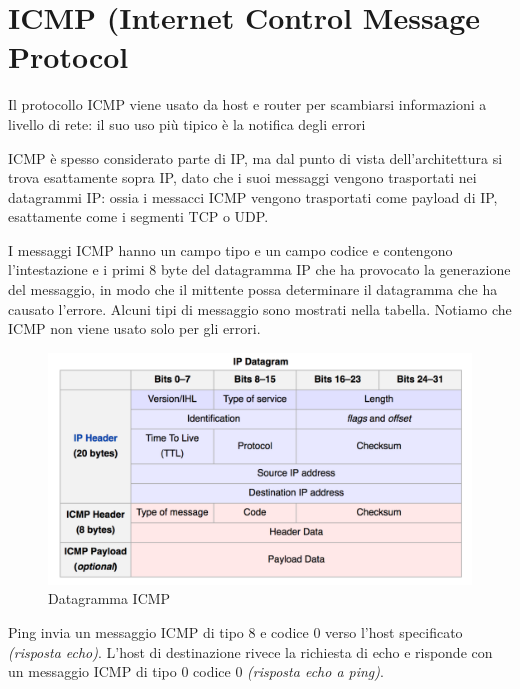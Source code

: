 \documentclass[11pt,a4paper]{book}
\begin{document}
\section{ICMP (Internet Control Message Protocol} \label{par: ICMP}
Il protocollo ICMP viene usato da host e router per scambiarsi informazioni a livello di rete: il suo uso più tipico è la notifica degli errori

ICMP è spesso considerato parte di IP, ma dal punto di vista dell'architettura si trova esattamente sopra IP, dato che i suoi messaggi vengono trasportati nei datagrammi IP: ossia i messacci ICMP vengono trasportati come payload di IP, esattamente come i segmenti TCP o UDP.

I messaggi ICMP hanno un campo tipo e un campo codice e contengono l'intestazione e i primi 8 byte del datagramma IP che ha provocato la generazione del messaggio, in modo che il mittente possa determinare il datagramma che ha causato l'errore. Alcuni tipi di messaggio sono mostrati nella tabella. Notiamo che ICMP non viene usato solo per gli errori.
\begin{figure}
	\begin{center}
		\includegraphics[scale=0.23]{img/068.png}
		\caption{Datagramma ICMP}
		\label{fig: 068}
	\end{center}
\end{figure}

Ping invia un messaggio ICMP di tipo 8 e codice 0 verso l'host specificato \textit{(risposta echo)}. L'host di destinazione rivece la richiesta di echo e risponde con un messaggio ICMP di tipo 0 codice 0 \textit{(risposta echo a ping)}.
\end{document}

